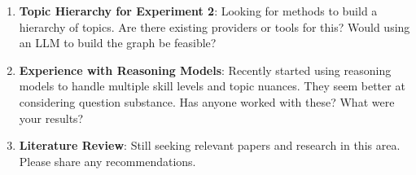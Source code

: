 \documentclass[
    a4paper, %
    10pt, %
    twoside %
]{LTJournalArticle}
\begin{document}
\begin{enumerate}
    \item \textbf{Topic Hierarchy for Experiment 2}: Looking for methods to build a hierarchy of topics. Are there existing providers or tools for this? Would using an LLM to build the graph be feasible?
    
    \item \textbf{Experience with Reasoning Models}: Recently started using reasoning models to handle multiple skill levels and topic nuances. They seem better at considering question substance. Has anyone worked with these? What were your results?
    
    \item \textbf{Literature Review}: Still seeking relevant papers and research in this area. Please share any recommendations.
\end{enumerate}
\end{document}
